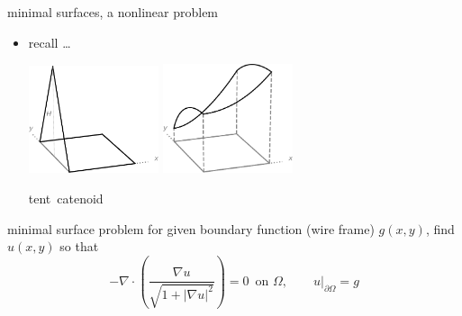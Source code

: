\documentclass[10pt,
               svgnames,
               hyperref={colorlinks,citecolor=DeepPink4,linkcolor=FireBrick,urlcolor=Maroon},
               usepdftitle=false]{beamer}
\newcommand{\grad}{\nabla}
\newcommand{\Div}{\nabla \cdot}
\begin{document}
\begin{frame}{minimal surfaces, a nonlinear problem}
\begin{itemize}
\item recall \dots

\vspace{-7mm}
\hfill \includegraphics[width=0.3\textwidth]{images/tent.png} \includegraphics[width=0.3\textwidth]{images/catenary.png}

\hfill \mbox{{\scriptsize tent} \hspace{36mm} {\scriptsize catenoid} \hspace{10mm}}
\end{itemize}

\bigskip
\begin{block}{minimal surface problem} for given boundary function (wire frame) $g(x,y)$, find $u(x,y)$ so that
    $$-\Div \left(\frac{\grad u}{\sqrt{1 + |\grad u|^2}}\right) = 0 \, \text{ on } \Omega, \qquad u\big|_{\partial \Omega} = g$$
\end{block}
\end{frame}
\end{document}
